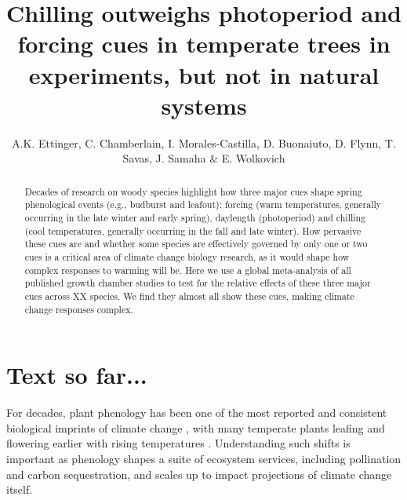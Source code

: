 \documentclass{article}
\begin{document}

\title{Chilling outweighs photoperiod and forcing cues in temperate trees in experiments, but not in natural systems} %

\author{A.K. Ettinger, C. Chamberlain, I. Morales-Castilla, D. Buonaiuto, D. Flynn, T. Savas, J. Samaha \& E. Wolkovich}
\maketitle  %


\begin{abstract}
Decades of research on woody species highlight how three major cues shape spring phenological events (e.g., budburst and leafout): forcing (warm temperatures, generally occurring in the late winter and early spring), daylength (photoperiod) and chilling (cool temperatures, generally occurring in the fall and late winter). How pervasive these cues are and whether some species are effectively governed by only one or two cues is a critical area of climate change biology research, as it would shape how complex responses to warming will be. Here we use a global meta-analysis of all published growth chamber studies to test for the relative effects of these three major cues across XX species. We find they almost all show these cues, making climate change responses complex. 
\end{abstract}

\section* {Text so far...}

\par For decades, plant phenology has been one of the most reported and consistent biological imprints of climate change \citep{IPCC:2014sm}, with many temperate plants leafing and flowering earlier with rising temperatures \citep{millerrushing2008,menzel2006}. Understanding such shifts is important as phenology shapes a suite of ecosystem services, including pollination and carbon sequestration, and scales up to impact projections of climate change itself. 
\end{document}
